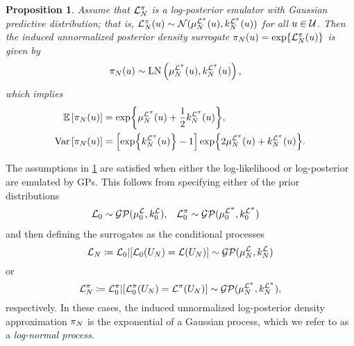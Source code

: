 \documentclass[12pt]{article}
\newtheorem{prop}{Proposition}
\begin{document}
\begin{prop} \label{prop:llik-em-Gaussian}
Assume that $\lpostEm[\Ndesign]$ is a log-posterior emulator with Gaussian predictive distribution; 
that is, $\lpostEm[\Ndesign](\Par) \sim \Gaussian(\emMean[\Ndesign]{\lpost}(\Par), \emKer[\Ndesign]{\lpost}(\Par))$
for all $\Par \in \parSpace$. Then the induced unnormalized posterior density surrogate 
$\postEm[\Ndesign](\Par) = \Exp{\lpostEm[\Ndesign](\Par)}$ is given by
\begin{align}
\postEm[\Ndesign](\Par) &\sim \text{LN}\left(\emMean[\Ndesign]{\lpost}(\Par), \emKer[\Ndesign]{\lpost}(\Par)\right),
\end{align}
which implies 
\begin{align}
\E\left[\postEm[\Ndesign](\Par)\right] &= \Exp{\emMean[\Ndesign]{\lpost}(\Par) + \frac{1}{2}\emKer[\Ndesign]{\lpost}(\Par)}, \\
\Var\left[\postEm[\Ndesign](\Par)\right] &= \left[\Exp{\emKer[\Ndesign]{\lpost}(\Par)} - 1\right] \Exp{2\emMean[\Ndesign]{\lpost}(\Par) + \emKer[\Ndesign]{\lpost}(\Par)}.
\end{align}
\end{prop}

The assumptions in \cref{prop:llik-em-Gaussian} are satisfied when either the 
log-likelihood or log-posterior are emulated by GPs. This follows from specifying either of the 
prior distributions
\begin{align}
&\llikEm[0] \sim \GP(\emMean[0]{\llik}, \emKer[0]{\llik}),
&&\lpostEm[0] \sim \GP(\emMean[0]{\lpost}, \emKer[0]{\lpost})
\end{align}
and then defining the surrogates as the conditional processes 
\begin{equation}
\llikEm[\Ndesign] \Def \llikPrior | [\llikPrior(\designIn) = \llik(\designIn)] \sim \GP(\emMean[\Ndesign]{\llik}, \emKer[\Ndesign]{\llik})
\end{equation}
or
\begin{equation} 
\lpostEm[\Ndesign] \Def \lpostEm[0]  | [\lpostEm[0](\designIn) = \lpost(\designIn)] \sim \GP(\emMean[\Ndesign]{\lpost}, \emKer[\Ndesign]{\lpost}),
\end{equation}
respectively. In these cases, the induced unnormalized log-posterior density approximation 
$\postEm[\Ndesign]$ is the exponential of a Gaussian process, which we refer to as a 
\textit{log-normal process}.
\end{document}
